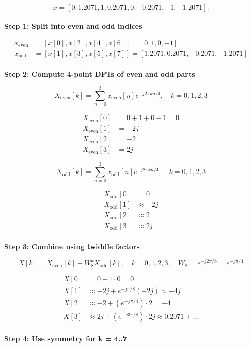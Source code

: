 \\
\begin{solutionblock}

\[
x = [0, 1.2071, 1, 0.2071, 0, -0.2071, -1, -1.2071].
\]
\\
\textbf{Step 1: Split into even and odd indices}

\[
\begin{aligned}
x_{\text{even}} &= [x[0], x[2], x[4], x[6]] = [0, 1, 0, -1] \\
x_{\text{odd}}  &= [x[1], x[3], x[5], x[7]] = [1.2071, 0.2071, -0.2071, -1.2071]
\end{aligned}
\]
\\
\textbf{Step 2: Compute 4-point DFTs of even and odd parts}

\[
X_{\text{even}}[k] = \sum_{n=0}^{3} x_{\text{even}}[n] e^{-j2\pi kn/4}, \quad k=0,1,2,3
\]

\[
\begin{aligned}
X_{\text{even}}[0] &= 0 + 1 + 0 -1 = 0 \\
X_{\text{even}}[1] &= -2j \\
X_{\text{even}}[2] &= -2 \\
X_{\text{even}}[3] &= 2j
\end{aligned}
\]

\[
X_{\text{odd}}[k] = \sum_{n=0}^{3} x_{\text{odd}}[n] e^{-j2\pi kn/4}, \quad k=0,1,2,3
\]

\[
\begin{aligned}
X_{\text{odd}}[0] &= 0 \\
X_{\text{odd}}[1] &\approx -2j \\
X_{\text{odd}}[2] &\approx 2 \\
X_{\text{odd}}[3] &\approx 2j
\end{aligned}
\]
\\
\textbf{Step 3: Combine using twiddle factors}

\[
X[k] = X_{\text{even}}[k] + W_8^k X_{\text{odd}}[k], \quad k=0,1,2,3, \quad W_8 = e^{-j2\pi/8} = e^{-j\pi/4}
\]

\[
\begin{aligned}
X[0] &= 0 + 1\cdot 0 = 0 \\
X[1] &\approx -2j + e^{-j\pi/8}(-2j) \approx -4j \\
X[2] &\approx -2 + (e^{-j\pi/4})\cdot 2 = -4 \\
X[3] &\approx 2j + (e^{-j3\pi/8})\cdot 2j \approx 0.2071 + \dots
\end{aligned}
\]
\\
\textbf{Step 4: Use symmetry for k = 4..7}


\end{solutionblock}

